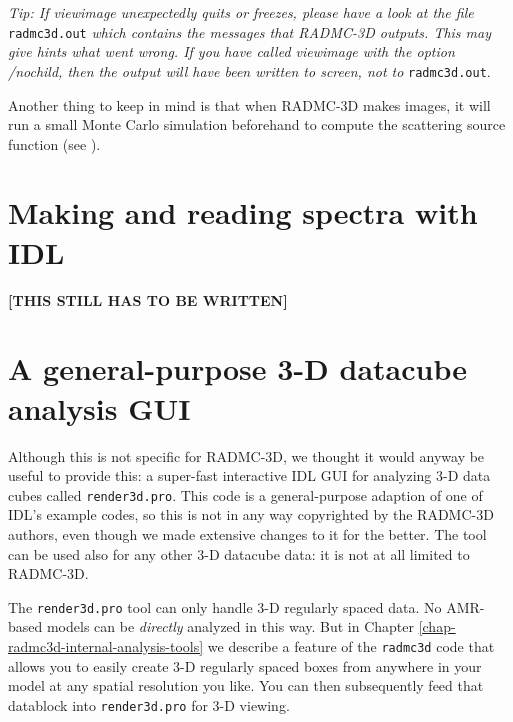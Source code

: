 \documentclass{report}
\begin{document}
{\em Tip: If viewimage unexpectedly quits or freezes, please have a look at
  the file} {\small\tt radmc3d.out} {\em which contains the messages that
  RADMC-3D outputs. This may give hints what went wrong. If you have called
viewimage with the option /nochild, then the output will have been written
to screen, not to} {\small\tt radmc3d.out}.

Another thing to keep in mind is that when RADMC-3D makes images, it will
run a small Monte Carlo simulation beforehand to compute the scattering
source function (see ).

\section{Making and reading spectra with IDL}
\label{sec-spectra-from-idl}
%
{\bf [THIS STILL HAS TO BE WRITTEN]}




\section{A general-purpose 3-D datacube analysis GUI}
\label{sec-render3d}
Although this is not specific for RADMC-3D, we thought it would anyway be
useful to provide this: a super-fast interactive IDL GUI for analyzing 3-D
data cubes called {\small\tt render3d.pro}. This code is a general-purpose
adaption of one of IDL's example codes, so this is not in any way
copyrighted by the RADMC-3D authors, even though we made extensive changes
to it for the better. The tool can be used also for any other 3-D datacube
data: it is not at all limited to RADMC-3D. 

The {\small\tt render3d.pro} tool can only handle 3-D regularly spaced
data. No AMR-based models can be {\em directly} analyzed in this way. But
in Chapter \ref{chap-radmc3d-internal-analysis-tools} we describe a feature
of the {\small\tt radmc3d} code that allows you to easily create 3-D regularly
spaced boxes from anywhere in your model at any spatial resolution you like.
You can then subsequently feed that datablock into {\small\tt render3d.pro}
for 3-D viewing. 
\end{document}
